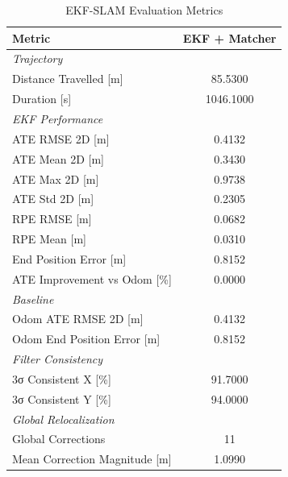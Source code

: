 \begin{table}[htbp]
\centering
\caption{EKF-SLAM Evaluation Metrics}
\label{tab:ekf_results}
\begin{tabular}{lc}
\toprule
Metric & \textbf{EKF + Matcher} \\
\midrule
\multicolumn{2}{l}{\textit{Trajectory}} \\
Distance Travelled [m] & 85.5300 \\
Duration [s] & 1046.1000 \\
\midrule
\multicolumn{2}{l}{\textit{EKF Performance}} \\
ATE RMSE 2D [m] & 0.4132 \\
ATE Mean 2D [m] & 0.3430 \\
ATE Max 2D [m] & 0.9738 \\
ATE Std 2D [m] & 0.2305 \\
RPE RMSE [m] & 0.0682 \\
RPE Mean [m] & 0.0310 \\
End Position Error [m] & 0.8152 \\
ATE Improvement vs Odom [\%] & 0.0000 \\
\midrule
\multicolumn{2}{l}{\textit{Baseline}} \\
Odom ATE RMSE 2D [m] & 0.4132 \\
Odom End Position Error [m] & 0.8152 \\
\midrule
\multicolumn{2}{l}{\textit{Filter Consistency}} \\
3σ Consistent X [\%] & 91.7000 \\
3σ Consistent Y [\%] & 94.0000 \\
\midrule
\multicolumn{2}{l}{\textit{Global Relocalization}} \\
Global Corrections & 11 \\
Mean Correction Magnitude [m] & 1.0990 \\
\midrule
\bottomrule
\end{tabular}
\end{table}
